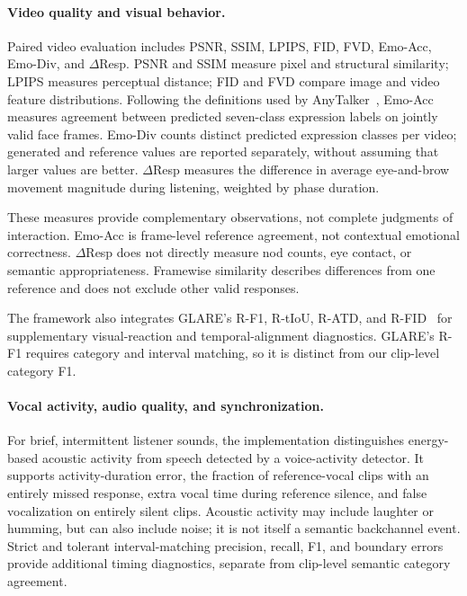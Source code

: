 \paragraph{Video quality and visual behavior.}
Paired video evaluation includes PSNR, SSIM, LPIPS, FID, FVD, Emo-Acc, Emo-Div, and $\Delta$Resp. PSNR and SSIM measure pixel and structural similarity; LPIPS measures perceptual distance; FID and FVD compare image and video feature distributions. Following the definitions used by AnyTalker~\cite{anytalker}, Emo-Acc measures agreement between predicted seven-class expression labels on jointly valid face frames. Emo-Div counts distinct predicted expression classes per video; generated and reference values are reported separately, without assuming that larger values are better. $\Delta$Resp measures the difference in average eye-and-brow movement magnitude during listening, weighted by phase duration.

These measures provide complementary observations, not complete judgments of interaction. Emo-Acc is frame-level reference agreement, not contextual emotional correctness. $\Delta$Resp does not directly measure nod counts, eye contact, or semantic appropriateness. Framewise similarity describes differences from one reference and does not exclude other valid responses.

The framework also integrates GLARE's R-F1, R-tIoU, R-ATD, and R-FID~\cite{glare} for supplementary visual-reaction and temporal-alignment diagnostics. GLARE's R-F1 requires category and interval matching, so it is distinct from our clip-level category F1.

\paragraph{Vocal activity, audio quality, and synchronization.}
For brief, intermittent listener sounds, the implementation distinguishes energy-based acoustic activity from speech detected by a voice-activity detector. It supports activity-duration error, the fraction of reference-vocal clips with an entirely missed response, extra vocal time during reference silence, and false vocalization on entirely silent clips. Acoustic activity may include laughter or humming, but can also include noise; it is not itself a semantic backchannel event. Strict and tolerant interval-matching precision, recall, F1, and boundary errors provide additional timing diagnostics, separate from clip-level semantic category agreement.

